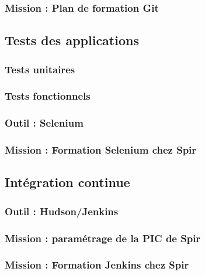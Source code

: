 \subsubsection{Mission : Plan de formation Git}



\subsection{Tests des applications}

\subsubsection{Tests unitaires}

\subsubsection{Tests fonctionnels}

\subsubsection{Outil : Selenium}

\subsubsection{Mission : Formation Selenium chez Spir}



\subsection{Intégration continue}

\subsubsection{Outil : Hudson/Jenkins}

\subsubsection{Mission : paramétrage de la PIC de Spir}

\subsubsection{Mission : Formation Jenkins chez Spir}

